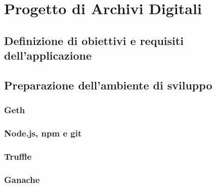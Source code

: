 \chapter{Progetto di Archivi Digitali}

\blindtext

\section{Definizione di obiettivi e requisiti dell’applicazione}

\blindtext

\section{Preparazione dell'ambiente di sviluppo}

\blindtext

\subsection{Geth}

\blindtext

\subsection{Node.js, npm e git}

\blindtext

\subsection{Truffle}

\blindtext

\subsection{Ganache}

\blindtext